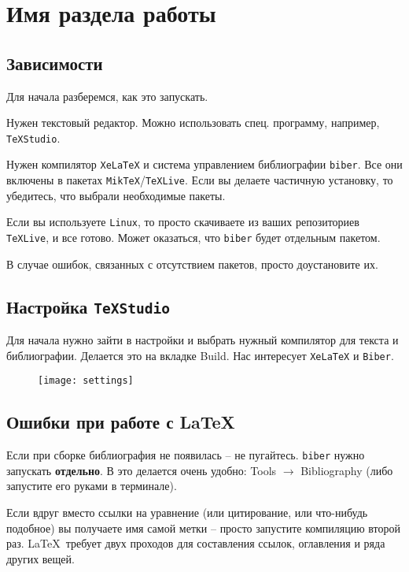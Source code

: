 
\section{Имя раздела работы}

\subsection{Зависимости}
Для начала разберемся, как это запускать. 

Нужен текстовый редактор. Можно использовать спец. программу, например, \texttt{TeXStudio}. 

Нужен компилятор \texttt{XeLaTeX} и система управлением библиографии \texttt{biber}. Все они включены в пакетах \texttt{MikTeX}/\texttt{TeXLive}. Если вы делаете частичную установку, то убедитесь, что выбрали необходимые пакеты. 

Если вы используете \texttt{Linux}, то просто скачиваете из ваших репозиториев \texttt{TeXLive}, и все готово. Может оказаться, что \texttt{biber} будет отдельным пакетом. 

В случае ошибок, связанных с отсутствием пакетов, просто доустановите их.

\subsection{Настройка \texttt{TeXStudio}}

Для начала нужно зайти в настройки и выбрать нужный компилятор для текста и библиографии. Делается это на вкладке Build. Нас интересует \texttt{XeLaTeX} и \texttt{Biber}.
\begin{figure}[H]
    \centering
    \texttt{[image: settings]}
\end{figure}


\subsection{Ошибки при работе с \LaTeX}
Если при сборке библиография не появилась -- не пугайтесь. \texttt{biber} нужно запускать \textbf{отдельно}. В  это делается очень удобно: Tools $\rightarrow$ Bibliography (либо запустите его руками в терминале).

Если вдруг вместо ссылки на уравнение (или цитирование, или что-нибудь подобное) вы получаете имя самой метки -- просто запустите компиляцию второй раз. \LaTeX\, требует двух проходов для составления ссылок, оглавления и ряда других вещей. 

